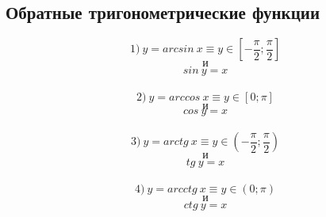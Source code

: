\documentclass{article}
\begin{document}
 \begin{center}
     \section*{Обратные тригонометрические функции}
\end{center}
    \huge $$ 1) \ y = arcsin \ x \equiv y \in [-\frac{\pi }{2};\frac{\pi }{2}]$$ $$\text{и}$$ $$sin \ y = x$$\\ [2mm]
   $$ 2) \ y = arccos \ x \equiv y \in [0;\pi]$$ $$\text{и} $$ $$cos \ y = x$$\\[2mm]
    $$ 3) \ y = arctg \ x \equiv y \in (-\frac{\pi }{2};\frac{\pi }{2})$$ $$\text{и}$$ $$ tg \ y = x$$\\ [2mm]
    $$ 4) \ y = arcctg \ x \equiv y \in (0;\pi)$$ $$\text{и} $$ $$ctg \ y = x$$\\[2mm]
\end{document}
